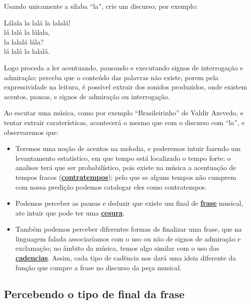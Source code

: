 \begin{example}
Usando unicamente a silaba ``la'', crie um discurso; por exemplo:
\begin{citando}%
Lálala la lalá la lalalá!\\
lá lalá la lálala,\\
la lalalá lála?\\
lá lalá la lalalá.\\
\end{citando}%
Logo proceda a ler acentuando, pausando e
executando signos de interrogação e admiração;
perceba que o conteúdo das palavras não existe, 
porem pela expressividade na leitura,
é possível extrair dos sonidos produzidos,
onde existem acentos, pausas, e signos de admiração ou interrogação.

Ao escutar uma música, como por exemplo ``Brasileirinho''  de Valdir Azevedo, 
e tentar extrair caraterísticas, acontecerá o mesmo que com o discurso com ``la'', e observaremos que:
\begin{itemize}
\item Teremos uma noção de acentos na melodia, e poderemos intuir fazendo um levantamento estatístico,
em que tempo está localizado o tempo forte; o analises terá que ser probabilístico,
pois existe na música a acentuação de tempos fracos (\hyperref[fig:contratempo]{\textbf{contratempos}}); 
pelo que se alguns tempos não cumprem com nossa predição podemos catalogar eles como contratempos.
\item Podemos perceber as pausas e deduzir que existe um final de \hyperref[fig:Frase]{\textbf{frase}} musical,
ate intuir que pode ter uma \hyperref[fig:Cesura]{\textbf{cesura}}.
\item Também podemos perceber diferentes formas de finalizar uma frase, 
que na linguagem falada associaríamos com o uso ou não de signos de admiração e exclamação;
no âmbito da música, temos algo similar com o uso das \hyperref[fig:Cadencia]{\textbf{cadencias}}.
Assim, cada tipo de cadência nos dará uma ideia diferente da função que cumpre a frase no discurso da peça musical.
\end{itemize}
\end{example}

\subsection{Percebendo o tipo de final da frase}

